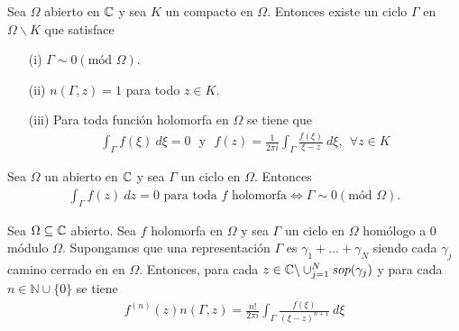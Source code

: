 \begin{teo}
    Sea $\Omega$ abierto en $\mathbb{C}$ y sea $K$ un compacto en $\Omega$. Entonces existe un ciclo $\Gamma$ en $\Omega \backslash K$ que satisface
    \begin{enumerate}
        \item[(i)] $\Gamma \sim 0 (\text{mód } \Omega)$.
        \item[(ii)] $n(\Gamma,z) = 1$ para todo $z \in K$.
        \item[(iii)] Para toda función holomorfa en $\Omega$ se tiene que
              \begin{align*}
                  \int_{\Gamma} f(\xi) \ d\xi = 0 \ \ \ \text{y} \ \ \ f(z) = \frac{1}{2\pi i}\int_{\Gamma} \frac{f(\xi)}{\xi - z} \ d\xi, \ \ \forall z\in K
              \end{align*}
    \end{enumerate}
\end{teo}

\begin{teo}
    Sea $\Omega$ un abierto en $\mathbb{C}$ y sea $\Gamma$ un ciclo en $\Omega$. Entonces
    \begin{align*}
        \int_{\Gamma} f(z) \ dz = 0 \text{ para toda } f \text{ holomorfa}\Longleftrightarrow \Gamma \sim 0 (\text{mód } \Omega).
    \end{align*}
\end{teo}

\begin{teo}
    Sea $\Omega \subseteq \mathbb{C}$ abierto. Sea $f$ holomorfa en $\Omega$ y sea $\Gamma$ un ciclo en $\Omega$ homólogo a 0 módulo $\Omega$. Supongamos que una representación $\Gamma$ es $\gamma_1 + ... + \gamma_N$ siendo cada $\gamma_j$ camino cerrado en en $\Omega$. Entonces, para cada $z \in \mathbb{C} \backslash \cup_{j=1}^{N} sop(\gamma_j)$ y para cada $n \in \mathbb{N} \cup \{0\}$ se tiene
    \begin{align*}
        f^{(n)}(z)n(\Gamma,z) = \frac{n!}{2\pi i} \int_{\Gamma} \frac{f(\xi)}{(\xi - z)^{n+1}} \ d\xi
    \end{align*}
\end{teo}

